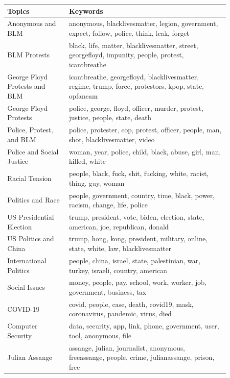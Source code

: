\documentclass[letterpaper]{article}
\begin{document}
\begin{table}[!ht]
\footnotesize
\centering
\begin{tabular}{p{0.25\linewidth} >{\raggedright\arraybackslash}p{0.65\linewidth}}
 \toprule
 \textbf{Topics} & \textbf{Keywords} \\ [0.5ex]
 \midrule
 Anonymous and BLM & anonymous, blacklivesmatter, legion, government, expect, follow, police, think, leak, forget \\
 \midrule
BLM Protests & black, life, matter, blacklivesmatter, street, georgefloyd, impunity, people, protest, icantbreathe \\
 \midrule
George Floyd Protests and BLM & icantbreathe, georgefloyd, blacklivesmatter, regime, trump, force, protestors, kpop, state, opfancam \\
  \midrule
George Floyd Protests & police, george, floyd, officer, murder, protest, justice, people, state, death \\
  \midrule
Police, Protest, and BLM & police, protester, cop, protest, officer, people, man, shot, blacklivesmatter, video \\
 \midrule
Police and Social Justice & woman, year, police, child, black, abuse, girl, man, killed, white \\
  \midrule
 Racial Tension & people, black, fuck, shit, fucking, white, racist, thing, guy, woman \\
   \midrule
Politics and Race & people, government, country, time, black, power, racism, change, life, police \\
  \midrule
US Presidential Election & trump, president, vote, biden, election, state, american, joe, republican, donald \\
 \midrule
 US Politics and China & trump, hong, kong, president, military, online, state, white, law, blacklivesmatter \\
  \midrule
International Politics & people, china, israel, state, palestinian, war, turkey, israeli, country, american \\
  \midrule
Social Issues & money, people, pay, school, work, worker, job, government, business, tax \\
  \midrule
COVID-19 & covid, people, case, death, covid19, mask, coronavirus, pandemic, virus, died \\
  \midrule
Computer Security & data, security, app, link, phone, government, user, tool, anonymous, file \\
 \midrule
 Julian Assange & assange, julian, journalist, anonymous, freeassange, people, crime, julianassange, prison, free \\

\end{tabular}
\end{table}
\end{document}
